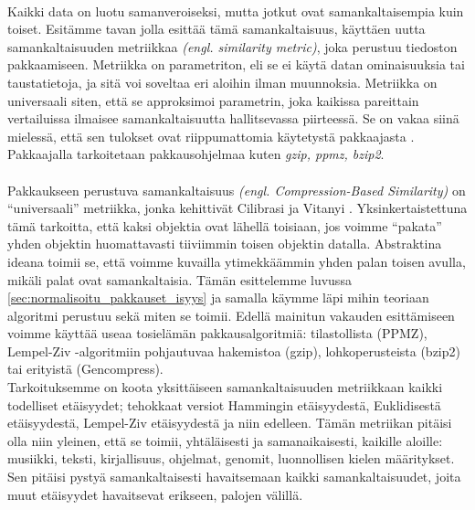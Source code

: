 \documentclass[12pt,finnish,draft]{tktltiki2}
\theoremstyle{definition}
\theoremstyle{remark}
\newcommand{\engl}[1]{\emph{(engl. #1)}}
\begin{document}
\paragraph{} %
\label{par:intro-1}
  Kaikki data on luotu samanveroiseksi, mutta jotkut ovat samankaltaisempia kuin toiset.
  Esitämme tavan jolla esittää tämä samankaltaisuus, käyttäen uutta samankaltaisuuden metriikkaa \engl{similarity metric}, joka perustuu tiedoston pakkaamiseen. Metriikka on parametriton, eli se ei käytä datan ominaisuuksia tai taustatietoja, ja sitä voi soveltaa eri aloihin ilman muunnoksia.
  Metriikka on universaali siten, että se approksimoi parametrin, joka kaikissa pareittain vertailuissa ilmaisee samankaltaisuutta hallitsevassa piirteessä. Se on vakaa siinä mielessä, että sen tulokset ovat riippumattomia käytetystä pakkaajasta \cite{CV05}. Pakkaajalla tarkoitetaan pakkausohjelmaa kuten \emph{gzip, ppmz, bzip2}.



\paragraph{} %
\label{par:intro-2}
  Pakkaukseen perustuva samankaltaisuus \engl{Compression-Based Similarity} on ``universaali'' metriikka, jonka kehittivät Cilibrasi ja Vitanyi \cite{CV05}. Yksinkertaistettuna tämä tarkoitta, että kaksi objektia ovat lähellä toisiaan, jos voimme ``pakata'' yhden objektin huomattavasti tiiviimmin toisen objektin datalla. Abstraktina ideana toimii se, että voimme kuvailla ytimekkäämmin yhden palan toisen avulla, mikäli palat ovat samankaltaisia. Tämän esittelemme luvussa \ref{sec:normalisoitu_pakkauset_isyys} ja samalla käymme läpi mihin teoriaan algoritmi perustuu sekä miten se toimii. Edellä mainitun vakauden esittämiseen voimme käyttää useaa tosielämän pakkausalgoritmiä: tilastollista (PPMZ), Lempel-Ziv -algoritmiin pohjautuvaa hakemistoa (gzip), lohkoperusteista (bzip2) tai erityistä (Gencompress).
\\

  Tarkoituksemme on koota yksittäiseen samankaltaisuuden metriikkaan kaikki todelliset etäisyydet; tehokkaat versiot Hammingin etäisyydestä, Euklidisestä etäisyydestä, Lempel-Ziv etäisyydestä ja niin edelleen. Tämän metriikan pitäisi olla niin yleinen, että se toimii, yhtäläisesti ja samanaikaisesti, kaikille aloille: musiikki, teksti, kirjallisuus, ohjelmat, genomit, luonnollisen kielen määritykset. Sen pitäisi pystyä samankaltaisesti havaitsemaan kaikki samankaltaisuudet, joita muut etäisyydet havaitsevat erikseen, palojen välillä.
\end{document}
